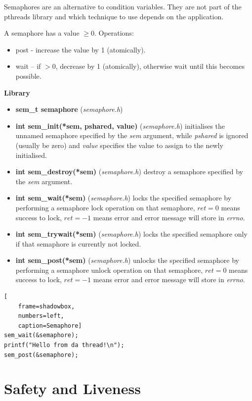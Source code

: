 \documentclass{article}
\begin{document}
Semaphores are an alternative to condition variables. They are not part of the pthreads library and which technique to use depends on the application.

A semaphore has a value $\geq 0$. Operations:

\begin{itemize}
    \item post - increase the value by 1 (atomically).
    \item wait – if $> 0$, decrease by 1 (atomically), otherwise wait until this becomes possible.
\end{itemize}

\textbf{Library}

\begin{itemize}
    \item \textbf{sem\_t semaphore} (\textit{semaphore.h})
    \item \textbf{int sem\_init(*sem, pshared, value)} (\textit{semaphore.h}) initialises the unnamed semaphore specified by the \textit{sem} argument, while \textit{pshared} is ignored (usually be zero) and \textit{value} specifies the value to assign to the newly initialised.
    \item \textbf{int sem\_destroy(*sem)} (\textit{semaphore.h}) destroy a semaphore specified by the \textit{sem} argument.
    \item \textbf{int sem\_wait(*sem)} (\textit{semaphore.h}) locks the specified semaphore by performing a semaphore lock operation on that semaphore, $ret = 0$ means success to lock, $ret = -1$ means error and error message will store in \textit{errno}.
    \item \textbf{int sem\_trywait(*sem)} (\textit{semaphore.h}) locks the specified semaphore only if that semaphore is currently not locked.
    \item \textbf{int sem\_post(*sem)} (\textit{semaphore.h}) unlocks the specified semaphore by performing a semaphore unlock operation on that semaphore, $ret = 0$ means success to lock, $ret = -1$ means error and error message will store in \textit{errno}.
\end{itemize}

\begin{lstlisting}[
    frame=shadowbox,
    numbers=left,
    caption=Semaphore]
sem_wait(&semaphore);
printf("Hello from da thread!\n");
sem_post(&semaphore);
\end{lstlisting}



\section{Safety and Liveness}
\end{document}
